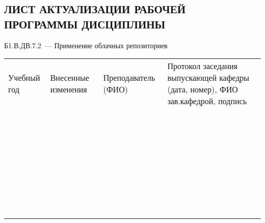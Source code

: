 \documentclass[a4paper,12pt]{article}
\begin{document}
\newpage
\begin{center}
\section*{ЛИСТ АКТУАЛИЗАЦИИ РАБОЧЕЙ ПРОГРАММЫ ДИСЦИПЛИНЫ}
Б1.В.ДВ.7.2\ --- Применение облачных репозиториев 
\end{center}

  \noindent
  \begin{tabular}{|p{15mm}|p{67mm}|p{25mm}|p{41mm}|}
    \hline
    \small\centering
    Учебный год 
    & \small\centering
    Внесенные изменения 
    & \small\centering
    Преподаватель (ФИО) 
    & \small\centering\arraybackslash
    Протокол заседания выпускающей кафедры (дата, номер), ФИО зав.кафедрой, подпись \\
    & & & \\\hline
    & & & \\\hline
    & & & \\\hline
    & & & \\\hline
    & & & \\\hline
    & & & \\\hline
    & & & \\\hline
    & & & \\\hline
    & & & \\\hline
    & & & \\\hline
    & & & \\\hline
    & & & \\\hline
    & & & \\\hline
    & & & \\\hline
    & & & \\\hline
    & & & \\\hline
    & & & \\\hline
    & & & \\\hline
    & & & \\\hline
    & & & \\\hline
    & & & \\\hline
    & & & \\\hline
    & & & \\\hline
    & & & \\\hline
    & & & \\\hline
    & & & \\\hline
    & & & \\\hline
    & & & \\\hline
    & & & \\\hline
    & & & \\\hline
    & & & \\\hline
    & & & \\\hline
    & & & \\\hline
    & & & \\\hline
    & & & \\\hline
    & & & \\\hline
  \end{tabular}
\end{document}
